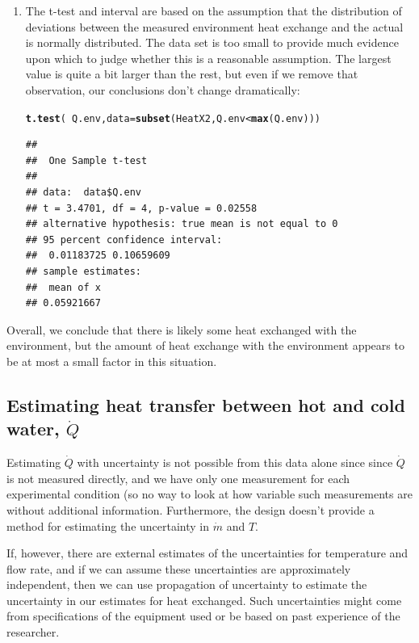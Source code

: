 \documentclass[twoside]{book}\usepackage[]{graphicx}\usepackage[]{xcolor}
\makeatletter
\newcommand{\hlopt}[1]{\textcolor[rgb]{0,0,0}{#1}}%
\newcommand{\hlstd}[1]{\textcolor[rgb]{0.345,0.345,0.345}{#1}}%
\newcommand{\hlkwc}[1]{\textcolor[rgb]{0.333,0.667,0.333}{#1}}%
\newcommand{\hlkwd}[1]{\textcolor[rgb]{0.737,0.353,0.396}{\textbf{#1}}}%
\newenvironment{kframe}{%
 \def\at@end@of@kframe{}%
 \ifinner\ifhmode%
  \def\at@end@of@kframe{\end{minipage}}%
  \begin{minipage}{\columnwidth}%
 \fi\fi%
 \def\FrameCommand##1{\hskip\@totalleftmargin \hskip-\fboxsep
 \colorbox{shadecolor}{##1}\hskip-\fboxsep
     \hskip-\linewidth \hskip-\@totalleftmargin \hskip\columnwidth}%
 \MakeFramed {\advance\hsize-\width
   \@totalleftmargin\z@ \linewidth\hsize
   \@setminipage}}%
 {\par\unskip\endMakeFramed%
 \at@end@of@kframe}
\newenvironment{knitrout}{}{} %
\makeatother
\begin{document}
\begin{enumerate}
\begin{knitrout}
\end{knitrout}
\item
The t-test and interval are based on the assumption that the distribution
of deviations between the measured environment heat exchange and the actual
is normally distributed.  The data set is too small to provide much evidence
upon which to judge whether this is a reasonable assumption.  The largest value is 
quite a bit larger than the rest, but even if we remove that observation, our 
conclusions don't change dramatically:
\begin{knitrout}
\color{fgcolor}\begin{kframe}
\begin{alltt}
\hlkwd{t.test}\hlstd{(}\hlopt{~}\hlstd{Q.env,} \hlkwc{data} \hlstd{=} \hlkwd{subset}\hlstd{(HeatX2, Q.env} \hlopt{<} \hlkwd{max}\hlstd{(Q.env)))}
\end{alltt}
\begin{verbatim}
## 
## 	One Sample t-test
## 
## data:  data$Q.env
## t = 3.4701, df = 4, p-value = 0.02558
## alternative hypothesis: true mean is not equal to 0
## 95 percent confidence interval:
##  0.01183725 0.10659609
## sample estimates:
##  mean of x 
## 0.05921667
\end{verbatim}
\end{kframe}
\end{knitrout}
\end{enumerate}

Overall, we conclude that there is likely some heat exchanged with the environment, but 
the amount of heat exchange with the environment
appears to be at most a small factor in this situation.

\subsection{Estimating heat transfer between hot and cold water, $\dot{Q}$}

Estimating $\dot{Q}$ with uncertainty is not possible from this data alone since since 
$\dot{Q}$ is not measured directly, and we have only one measurement for each experimental
condition (so no way to look at how variable such measurements are without additional information.
Furthermore, the design doesn't provide a method for estimating the 
uncertainty in $\dot{m}$ and $T$.

If, however, there are external estimates of the uncertainties for temperature
and flow rate, and if we can assume these uncertainties are approximately
independent, then we can use propagation of uncertainty to estimate the
uncertainty in our estimates for heat exchanged.  Such uncertainties might come 
from specifications of the equipment used or be based on past experience of the
researcher.
\end{document}
